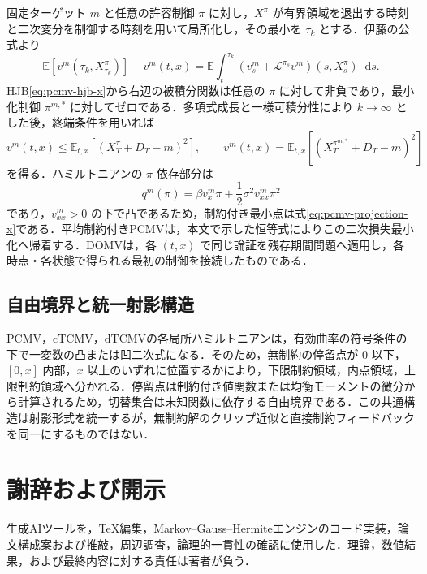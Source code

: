 \documentclass[10pt,a4paper]{article}
\theoremstyle{plain}
\theoremstyle{definition}
\newcommand{\E}{\mathbb{E}}
\newcommand{\Lop}{\mathcal{L}}
\newcommand{\dd}{\mathop{}\!\mathrm{d}}
\begin{document}
固定ターゲット $m$ と任意の許容制御 $\pi$ に対し，$X^\pi$ が有界領域を退出する時刻と二次変分を制御する時刻を用いて局所化し，その最小を $\tau_k$ とする．伊藤の公式より
\begin{equation}
 \E[v^m(\tau_k,X_{\tau_k}^\pi)]-v^m(t,x)
 =\E\int_t^{\tau_k}
 \left(v_s^m+\Lop^{\pi_s}v^m\right)(s,X_s^\pi)\dd s.
 \label{eq:app-pcmv-ito}
\end{equation}
HJB\eqref{eq:pcmv-hjb-x}から右辺の被積分関数は任意の $\pi$ に対して非負であり，最小化制御 $\pi^{m,*}$ に対してゼロである．多項式成長と一様可積分性により $k\to\infty$ とした後，終端条件を用いれば
\[
 v^m(t,x)\leq \E_{t,x}[(X_T^\pi+D_T-m)^2],
 \qquad
 v^m(t,x)=\E_{t,x}[(X_T^{\pi^{m,*}}+D_T-m)^2]
\]
を得る．ハミルトニアンの $\pi$ 依存部分は
\[
 q^m(\pi)=\beta v_x^m\pi+\frac12\sigma^2v_{xx}^m\pi^2
\]
であり，$v_{xx}^m>0$ の下で凸であるため，制約付き最小点は式\eqref{eq:pcmv-projection-x}である．平均制約付きPCMVは，本文で示した恒等式によりこの二次損失最小化へ帰着する．DOMVは，各 $(t,x)$ で同じ論証を残存期間問題へ適用し，各時点・各状態で得られる最初の制御を接続したものである．

\subsection*{自由境界と統一射影構造}

PCMV，cTCMV，dTCMVの各局所ハミルトニアンは，有効曲率の符号条件の下で一変数の凸または凹二次式になる．そのため，無制約の停留点が $0$ 以下，$[0,x]$ 内部，$x$ 以上のいずれに位置するかにより，下限制約領域，内点領域，上限制約領域へ分かれる．停留点は制約付き値関数または均衡モーメントの微分から計算されるため，切替集合は未知関数に依存する自由境界である．この共通構造は射影形式を統一するが，無制約解のクリップ近似と直接制約フィードバックを同一にするものではない．


\section*{謝辞および開示}
生成AIツールを，TeX編集，Markov--Gauss--Hermiteエンジンのコード実装，論文構成案および推敲，周辺調査，論理的一貫性の確認に使用した．理論，数値結果，および最終内容に対する責任は著者が負う．
\end{document}
